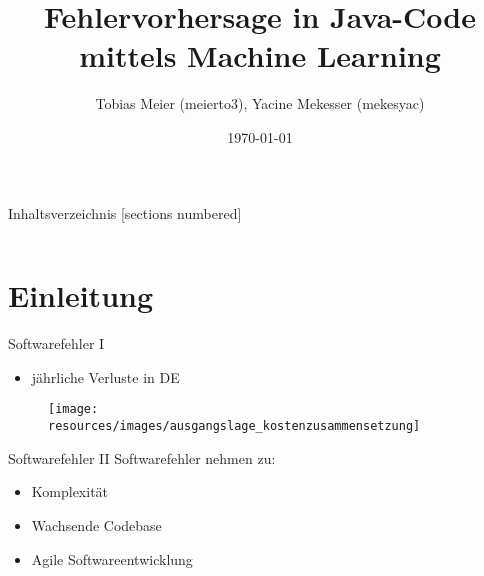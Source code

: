 \documentclass[12pt]{beamer}
\title{Fehlervorhersage in Java-Code mittels Machine Learning}
\date{\today}
\author{Tobias Meier (meierto3), Yacine Mekesser (mekesyac)}
\institute{ZHAW}
\begin{document}
\maketitle



\begin{frame}{Inhaltsverzeichnis}
	[sections numbered]
	\begin{columns}
		\begin{column}{0.5\textwidth}
			\tableofcontents[sections={1-6}]
		\end{column}
		\begin{column}{0.5\textwidth}
			\tableofcontents[sections={7-11}]
		\end{column}
	\end{columns}
\end{frame}


\section{Einleitung} %

\begin{frame}[fragile]{Softwarefehler I}
\begin{itemize}
	\item \alert{} jährliche Verluste in DE
\end{itemize}

\begin{figure}[h!]
	\centering
	\texttt{[image: resources/images/ausgangslage\_kostenzusammensetzung]}
	\label{fig:ml_example}
\end{figure}

\end{frame}

\begin{frame}[fragile]{Softwarefehler II}
	Softwarefehler nehmen zu:
	\begin{itemize}
		\item Komplexität
		\item Wachsende Codebase
		\item Agile Softwareentwicklung
	\end{itemize}
	
\end{frame}
\end{document}
